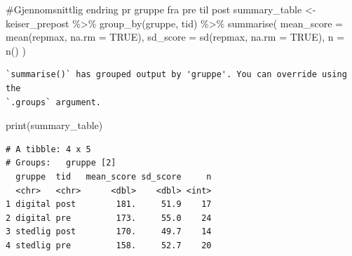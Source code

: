 \documentclass[
  letterpaper,
  DIV=11,
  numbers=noendperiod]{scrreprt}
\newenvironment{Shaded}{\begin{snugshade}}{\end{snugshade}}
\newcommand{\AttributeTok}[1]{\textcolor[rgb]{0.40,0.45,0.13}{#1}}
\newcommand{\CommentTok}[1]{\textcolor[rgb]{0.37,0.37,0.37}{#1}}
\newcommand{\ConstantTok}[1]{\textcolor[rgb]{0.56,0.35,0.01}{#1}}
\newcommand{\FunctionTok}[1]{\textcolor[rgb]{0.28,0.35,0.67}{#1}}
\newcommand{\NormalTok}[1]{\textcolor[rgb]{0.00,0.23,0.31}{#1}}
\newcommand{\OtherTok}[1]{\textcolor[rgb]{0.00,0.23,0.31}{#1}}
\newcommand{\SpecialCharTok}[1]{\textcolor[rgb]{0.37,0.37,0.37}{#1}}
\begin{document}
\begin{Shaded}
\begin{Highlighting}[]
\CommentTok{\#Gjennomsnittlig endring pr gruppe fra pre til post}
\NormalTok{summary\_table }\OtherTok{\textless{}{-}}\NormalTok{ keiser\_prepost }\SpecialCharTok{\%\textgreater{}\%}
  \FunctionTok{group\_by}\NormalTok{(gruppe, tid) }\SpecialCharTok{\%\textgreater{}\%}
  \FunctionTok{summarise}\NormalTok{(}
    \AttributeTok{mean\_score =} \FunctionTok{mean}\NormalTok{(repmax, }\AttributeTok{na.rm =} \ConstantTok{TRUE}\NormalTok{),}
    \AttributeTok{sd\_score =} \FunctionTok{sd}\NormalTok{(repmax, }\AttributeTok{na.rm =} \ConstantTok{TRUE}\NormalTok{),}
    \AttributeTok{n =} \FunctionTok{n}\NormalTok{()}
\NormalTok{  ) }
\end{Highlighting}
\end{Shaded}

\begin{verbatim}
`summarise()` has grouped output by 'gruppe'. You can override using the
`.groups` argument.
\end{verbatim}

\begin{Shaded}
\begin{Highlighting}[]
\FunctionTok{print}\NormalTok{(summary\_table)}
\end{Highlighting}
\end{Shaded}

\begin{verbatim}
# A tibble: 4 x 5
# Groups:   gruppe [2]
  gruppe  tid   mean_score sd_score     n
  <chr>   <chr>      <dbl>    <dbl> <int>
1 digital post        181.     51.9    17
2 digital pre         173.     55.0    24
3 stedlig post        170.     49.7    14
4 stedlig pre         158.     52.7    20
\end{verbatim}
\end{document}
